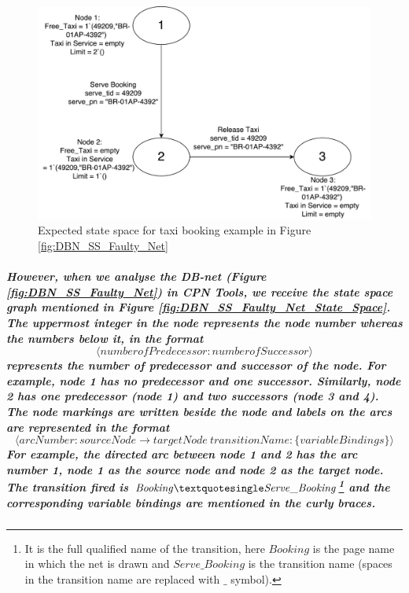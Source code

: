\begin{figure}[!htbp]
	\centering
	\includegraphics[scale = 0.40]{DBN_SS_Expected_State_Space.pdf}
	\caption{Expected state space for taxi booking example in Figure \ref{fig:DBN_SS_Faulty_Net}}
	\label{fig:DBN_SS_Expected_SS}
\end{figure}

\subparagraph*{\textnormal{However, when we analyse the DB-net (Figure \ref{fig:DBN_SS_Faulty_Net}) in CPN Tools, we receive the state space graph mentioned in Figure \ref{fig:DBN_SS_Faulty_Net_State_Space}. The uppermost integer in the node represents the node number whereas the numbers below it, in the format \[\langle numberofPredecessor : numberofSuccessor\rangle\] represents the number of predecessor and successor of the node. For example, node 1 has no predecessor and one successor. Similarly, node 2 has one predecessor (node 1) and two successors (node 3 and 4). The node markings are written beside the node and labels on the arcs are represented in the format \[\langle arcNumber : sourceNode \rightarrow targetNode\ transitionName : \{variableBindings\}\rangle\]For example, the directed arc between node 1 and 2 has the arc number 1, node 1 as the source node and node 2 as the target node. The transition fired is $\mathit{Booking\textquotesingle Serve\_Booking}$\footnote{It is the full qualified name of the transition, here $\mathit{Booking}$ is the page name in which the net is drawn and $\mathit{Serve\_Booking}$ is the transition name (spaces in the transition name are replaced with $\_$ symbol).} and the corresponding variable bindings are mentioned in the curly braces.}}

